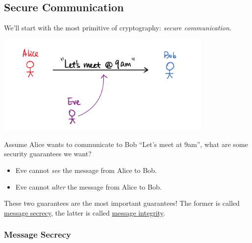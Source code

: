 \subsection{Secure Communication}
We'll start with the most primitive of cryptography: \emph{secure communication}.

\begin{center}
    \includegraphics[width=0.8\textwidth]{images/2023-01-26/secure_computation.png}
\end{center}

Assume Alice wants to communicate to Bob ``Let's meet at 9am'', what are some security guarantees we want?

\begin{itemize}
    \item Eve cannot \emph{see} the message from Alice to Bob.
    \item Eve cannot \emph{alter} the message from Alice to Bob.
\end{itemize}

These two guarantees are the most important guarantees! The former is called \ul{message secrecy}, the latter is called \ul{message integrity}.

\subsubsection{Message Secrecy}

